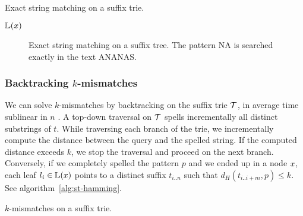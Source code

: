 \begin{algorithm}[h]
\caption{Exact string matching on a suffix trie.}
\label{alg:st-exact}
\begin{algorithmic}[1]
		\State \Report $\mathbb {L}(x)$
		\State {}
	\EndIf
\EndProcedure
\end{algorithmic}
\end{algorithm}

\begin{figure}[h]
\begin{center}
\caption[Exact string matching on a suffix tree.]{Exact string matching on a suffix tree. The pattern NA is searched exactly in the text ANANAS.}
\label{fig:st-exact}

\end{center}
\end{figure}

\subsubsection{Backtracking $k$-mismatches}

We can solve $k$-mismatches by backtracking \citep{Ukkonen1993, Baeza1999} on the suffix trie $\mathcal {T}$, in average time sublinear in $n$ \citep{Navarro2000}.
A top-down traversal on $\mathcal {T}$ spells incrementally all distinct substrings of $t$.
While traversing each branch of the trie, we incrementally compute the distance between the query and the spelled string.
If the computed distance exceeds $k$, we stop the traversal and proceed on the next branch.
Conversely, if we completely spelled the pattern $p$ and we ended up in a node $x$, each leaf $l_i \in \mathbb {L}(x)$ points to a distinct suffix $t_{i..n}$ such that $d_H(t_{i..i+m}, p) \leq k$.
See algorithm~\ref{alg:st-hamming}.

\begin{algorithm}[h]
\caption{$k$-mismatches on a suffix trie.}
\label{alg:st-hamming}
\begin{algorithmic}[1]
		\State {}
	\Else 
		\ForAll {$\Cn \in \Ci(\Tn)$}
				\State {}
			\Else
				\State {}
			\EndIf
		\EndFor
	\EndIf
\EndProcedure
\end{algorithmic}
\end{algorithm}

